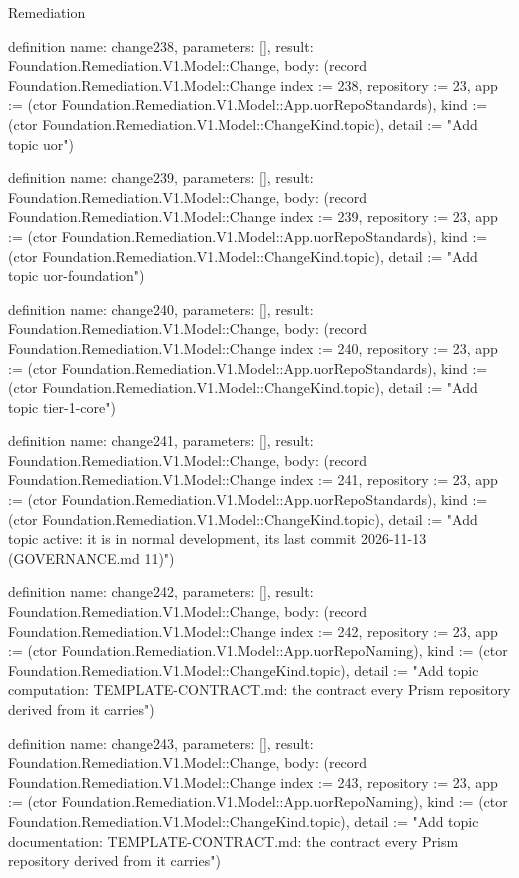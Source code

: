 \begin{lexlean}{Remediation}
\begin{semanticmodule}
definition{
  name: change238,
  parameters: [],
  result: Foundation.Remediation.V1.Model::Change,
  body: (record Foundation.Remediation.V1.Model::Change {index := 238, repository := 23, app := (ctor Foundation.Remediation.V1.Model::App.uorRepoStandards), kind := (ctor Foundation.Remediation.V1.Model::ChangeKind.topic), detail := "Add topic uor"})
}

definition{
  name: change239,
  parameters: [],
  result: Foundation.Remediation.V1.Model::Change,
  body: (record Foundation.Remediation.V1.Model::Change {index := 239, repository := 23, app := (ctor Foundation.Remediation.V1.Model::App.uorRepoStandards), kind := (ctor Foundation.Remediation.V1.Model::ChangeKind.topic), detail := "Add topic uor-foundation"})
}

definition{
  name: change240,
  parameters: [],
  result: Foundation.Remediation.V1.Model::Change,
  body: (record Foundation.Remediation.V1.Model::Change {index := 240, repository := 23, app := (ctor Foundation.Remediation.V1.Model::App.uorRepoStandards), kind := (ctor Foundation.Remediation.V1.Model::ChangeKind.topic), detail := "Add topic tier-1-core"})
}

definition{
  name: change241,
  parameters: [],
  result: Foundation.Remediation.V1.Model::Change,
  body: (record Foundation.Remediation.V1.Model::Change {index := 241, repository := 23, app := (ctor Foundation.Remediation.V1.Model::App.uorRepoStandards), kind := (ctor Foundation.Remediation.V1.Model::ChangeKind.topic), detail := "Add topic active: it is in normal development, its last commit 2026-11-13 (GOVERNANCE.md 11)"})
}

definition{
  name: change242,
  parameters: [],
  result: Foundation.Remediation.V1.Model::Change,
  body: (record Foundation.Remediation.V1.Model::Change {index := 242, repository := 23, app := (ctor Foundation.Remediation.V1.Model::App.uorRepoNaming), kind := (ctor Foundation.Remediation.V1.Model::ChangeKind.topic), detail := "Add topic computation: TEMPLATE-CONTRACT.md: the contract every Prism repository derived from it carries"})
}

definition{
  name: change243,
  parameters: [],
  result: Foundation.Remediation.V1.Model::Change,
  body: (record Foundation.Remediation.V1.Model::Change {index := 243, repository := 23, app := (ctor Foundation.Remediation.V1.Model::App.uorRepoNaming), kind := (ctor Foundation.Remediation.V1.Model::ChangeKind.topic), detail := "Add topic documentation: TEMPLATE-CONTRACT.md: the contract every Prism repository derived from it carries"})
}


\end{semanticmodule}
\end{lexlean}
